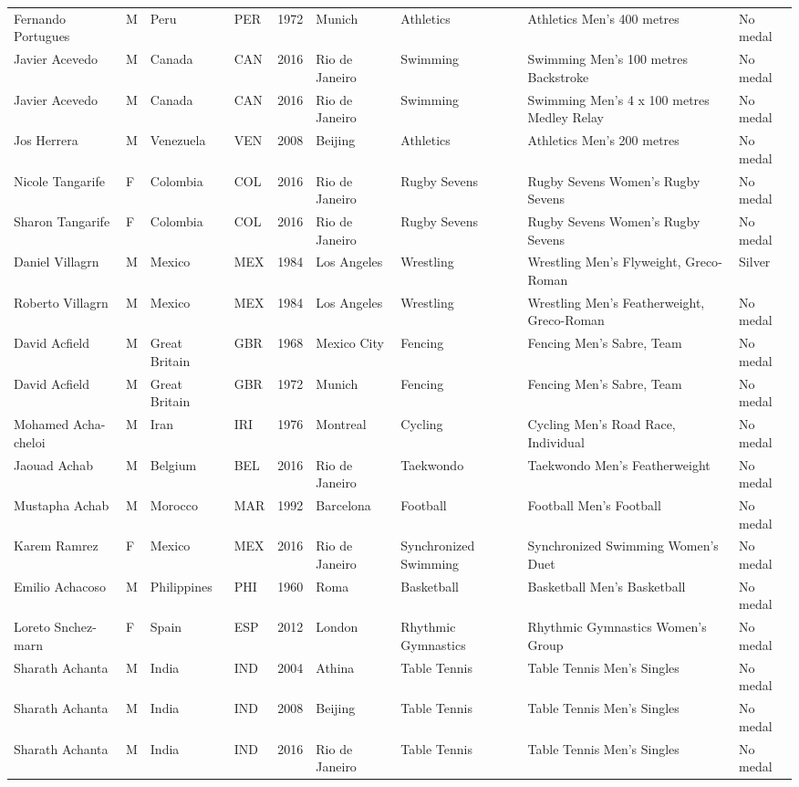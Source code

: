 \documentclass{article}%
\begin{document}
\begin{longtable}{p{1.5cm} p{0.5cm} p{2cm} p{1cm} p{1cm} p{1.5cm} p{1.5cm} p{5cm} p{1.5cm}}
Fernando Portugues&M&Peru&PER&1972&Munich&Athletics&Athletics Men's 400 metres&No medal\\%
Javier Acevedo&M&Canada&CAN&2016&Rio de Janeiro&Swimming&Swimming Men's 100 metres Backstroke&No medal\\%
Javier Acevedo&M&Canada&CAN&2016&Rio de Janeiro&Swimming&Swimming Men's 4 x 100 metres Medley Relay&No medal\\%
Jos Herrera&M&Venezuela&VEN&2008&Beijing&Athletics&Athletics Men's 200 metres&No medal\\%
Nicole Tangarife&F&Colombia&COL&2016&Rio de Janeiro&Rugby Sevens&Rugby Sevens Women's Rugby Sevens&No medal\\%
Sharon Tangarife&F&Colombia&COL&2016&Rio de Janeiro&Rugby Sevens&Rugby Sevens Women's Rugby Sevens&No medal\\%
Daniel Villagrn&M&Mexico&MEX&1984&Los Angeles&Wrestling&Wrestling Men's Flyweight, Greco{-}Roman&Silver\\%
Roberto Villagrn&M&Mexico&MEX&1984&Los Angeles&Wrestling&Wrestling Men's Featherweight, Greco{-}Roman&No medal\\%
David Acfield&M&Great Britain&GBR&1968&Mexico City&Fencing&Fencing Men's Sabre, Team&No medal\\%
David Acfield&M&Great Britain&GBR&1972&Munich&Fencing&Fencing Men's Sabre, Team&No medal\\%
Mohamed Acha{-}cheloi&M&Iran&IRI&1976&Montreal&Cycling&Cycling Men's Road Race, Individual&No medal\\%
Jaouad Achab&M&Belgium&BEL&2016&Rio de Janeiro&Taekwondo&Taekwondo Men's Featherweight&No medal\\%
Mustapha Achab&M&Morocco&MAR&1992&Barcelona&Football&Football Men's Football&No medal\\%
Karem Ramrez&F&Mexico&MEX&2016&Rio de Janeiro&Synchronized Swimming&Synchronized Swimming Women's Duet&No medal\\%
Emilio Achacoso&M&Philippines&PHI&1960&Roma&Basketball&Basketball Men's Basketball&No medal\\%
Loreto Snchez{-}marn&F&Spain&ESP&2012&London&Rhythmic Gymnastics&Rhythmic Gymnastics Women's Group&No medal\\%
Sharath Achanta&M&India&IND&2004&Athina&Table Tennis&Table Tennis Men's Singles&No medal\\%
Sharath Achanta&M&India&IND&2008&Beijing&Table Tennis&Table Tennis Men's Singles&No medal\\%
Sharath Achanta&M&India&IND&2016&Rio de Janeiro&Table Tennis&Table Tennis Men's Singles&No medal\\%

\end{longtable}
\end{document}

